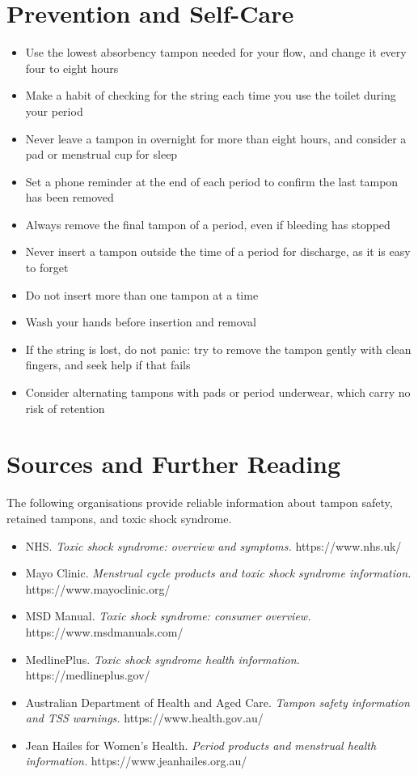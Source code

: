 \section*{Prevention and Self-Care}
\begin{itemize}
    \item Use the lowest absorbency tampon needed for your flow, and change it every four to eight hours
    \item Make a habit of checking for the string each time you use the toilet during your period
    \item Never leave a tampon in overnight for more than eight hours, and consider a pad or menstrual cup for sleep
    \item Set a phone reminder at the end of each period to confirm the last tampon has been removed
    \item Always remove the final tampon of a period, even if bleeding has stopped
    \item Never insert a tampon outside the time of a period for discharge, as it is easy to forget
    \item Do not insert more than one tampon at a time
    \item Wash your hands before insertion and removal
    \item If the string is lost, do not panic: try to remove the tampon gently with clean fingers, and seek help if that fails
    \item Consider alternating tampons with pads or period underwear, which carry no risk of retention
\end{itemize}

\section*{Sources and Further Reading}
The following organisations provide reliable information about tampon safety, retained tampons, and toxic shock syndrome.

\begin{itemize}
    \item NHS. \textit{Toxic shock syndrome: overview and symptoms.} https://www.nhs.uk/
    \item Mayo Clinic. \textit{Menstrual cycle products and toxic shock syndrome information.} https://www.mayoclinic.org/
    \item MSD Manual. \textit{Toxic shock syndrome: consumer overview.} https://www.msdmanuals.com/
    \item MedlinePlus. \textit{Toxic shock syndrome health information.} https://medlineplus.gov/
    \item Australian Department of Health and Aged Care. \textit{Tampon safety information and TSS warnings.} https://www.health.gov.au/
    \item Jean Hailes for Women's Health. \textit{Period products and menstrual health information.} https://www.jeanhailes.org.au/
\end{itemize}

